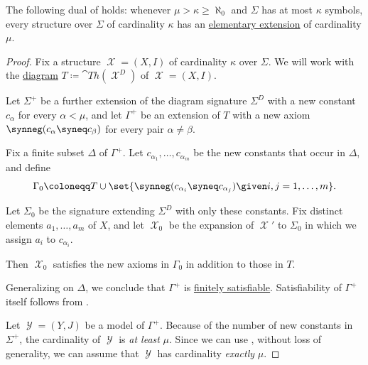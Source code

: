 \begin{theorem}\label{thm:upward_lowenheim_skolem_theorem}
  The following dual of  holds: whenever \( \mu > \kappa \geq \aleph_0 \) and \( \Sigma \) has at most \( \kappa \) symbols, every structure over \( \Sigma \) of cardinality \( \kappa \) has an \hyperref[def:elementary_embedding]{elementary extension} of cardinality \( \mu \).
\end{theorem}
\begin{proof}
  Fix a structure \( \mscrX = (X, I) \) of cardinality \( \kappa \) over \( \Sigma \). We will work with the \hyperref[def:fol_structure_diagram]{diagram} \( T \coloneqq \cat{Th}(\mscrX^D) \) of \( \mscrX = (X, I) \).

  Let \( \Sigma^+ \) be a further extension of the diagram signature \( \Sigma^D \) with a new constant \( c_\alpha \) for every \( \alpha < \mu \), and let \( \Gamma^+ \) be an extension of \( T \) with a new axiom \( \synneg (c_\alpha \syneq c_\beta) \) for every pair \( \alpha \neq \beta \).

   Fix a finite subset \( \Delta \) of \( \Gamma^+ \). Let \( c_{\alpha_1}, \dots, c_{\alpha_m} \) be the new constants that occur in \( \Delta \), and define
  \begin{equation*}
    \Gamma_0 \coloneqq T \cup \set{ \synneg (c_{\alpha_i} \syneq c_{\alpha_j}) \given i, j = 1, \ldots, m }.
  \end{equation*}

  Let \( \Sigma_0 \) be the signature extending \( \Sigma^D \) with only these constants. Fix distinct elements \( a_1, \ldots, a_m \) of \( X \), and let \( \mscrX_0 \) be the expansion of \( \mscrX' \) to \( \Sigma_0 \) in which we assign \( a_i \) to \( c_{\alpha_i} \).

  Then \( \mscrX_0 \) satisfies the new axioms in \( \Gamma_0 \) in addition to those in \( T \).

  Generalizing on \( \Delta \), we conclude that \( \Gamma^+ \) is \hyperref[def:finitely_satisfiable_set_of_sentences]{finitely satisfiable}. Satisfiability of \( \Gamma^+ \) itself follows from .

   Let \( \mscrY = (Y, J) \) be a model of \( \Gamma^+ \). Because of the number of new constants in \( \Sigma^+ \), the cardinality of \( \mscrY \) is \emph{at least} \( \mu \). Since we can use , without loss of generality, we can assume that \( \mscrY \) has cardinality \emph{exactly} \( \mu \).


\end{proof}
